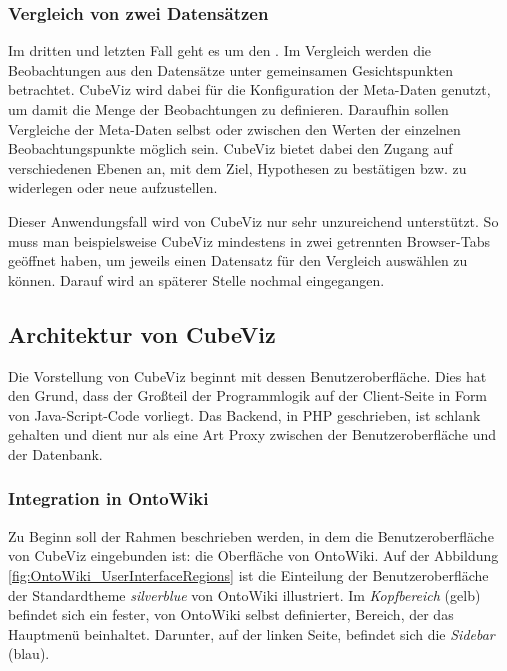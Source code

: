 \documentclass[11pt]{article}
\begin{document}
%
%
\subsubsection{Vergleich von zwei Datensätzen}
\label{sec:chapterUC3}

Im dritten und letzten Fall geht es um den . Im Vergleich werden die Beobachtungen aus den Datensätze unter gemeinsamen Gesichtspunkten betrachtet. CubeViz wird dabei für die Konfiguration der Meta-Daten genutzt, um damit die Menge der Beobachtungen zu definieren. Daraufhin sollen Vergleiche der Meta-Daten selbst oder zwischen den Werten der einzelnen Beobachtungspunkte möglich sein. CubeViz bietet dabei den Zugang auf verschiedenen Ebenen an, mit dem Ziel, Hypothesen zu bestätigen bzw. zu widerlegen oder neue aufzustellen. 


\newpage 
\noindent

Dieser Anwendungsfall wird von CubeViz nur sehr unzureichend unterstützt. So muss man beispielsweise CubeViz mindestens in zwei getrennten Browser-Tabs geöffnet haben, um jeweils einen Datensatz für den Vergleich auswählen zu können. Darauf wird an späterer Stelle nochmal eingegangen.




%
%
\subsection{Architektur von CubeViz}
\label{sec:chapterCVArchiUI}

Die Vorstellung von CubeViz beginnt mit dessen Benutzeroberfläche. Dies hat den Grund, dass der Großteil der Programmlogik auf der Client-Seite in Form von Java-Script-Code vorliegt. Das Backend, in PHP geschrieben, ist schlank gehalten und dient nur als eine Art Proxy zwischen der Benutzeroberfläche und der Datenbank.

%
%
\subsubsection{Integration in OntoWiki}

Zu Beginn soll der Rahmen beschrieben werden, in dem die Benutzeroberfläche von CubeViz eingebunden ist: die Oberfläche von OntoWiki. Auf der Abbildung \ref{fig:OntoWiki_UserInterfaceRegions} ist die Einteilung der Benutzeroberfläche der Standardtheme \textit{silverblue} von OntoWiki illustriert. Im \textit{Kopfbereich} (gelb) befindet sich ein fester, von OntoWiki selbst definierter, Bereich, der das Hauptmenü beinhaltet. Darunter, auf der linken Seite, befindet sich die \textit{Sidebar} (blau). \\
\end{document}
